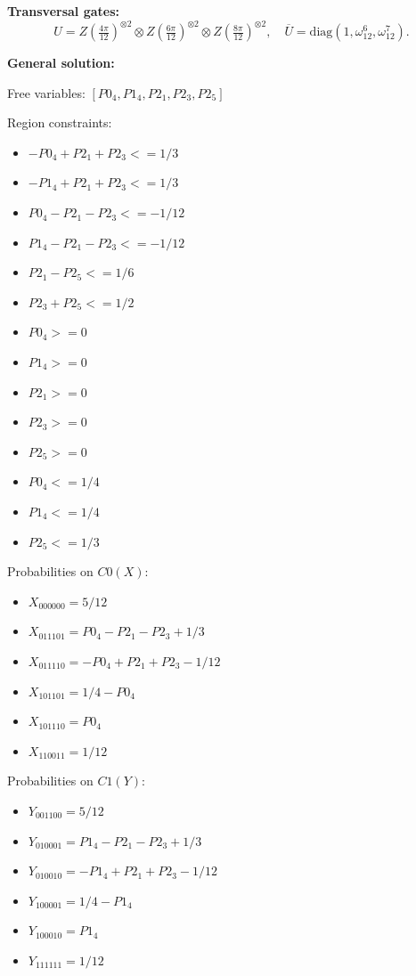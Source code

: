 \documentclass[11pt]{article}
\begin{document}
\noindent\textbf{Transversal gates:}
\[
    U=Z \left(\tfrac{4\pi}{12}\right)^{\otimes2} \otimes Z \left(\tfrac{6\pi}{12}\right)^{\otimes2} \otimes Z \left(\tfrac{8\pi}{12}\right)^{\otimes2},\quad
    \overline U=\mathrm{diag}(1,\omega_{12}^{6},\omega_{12}^{7}).
\]

\noindent\textbf{General solution:}

Free variables: $[P0_4, P1_4, P2_1, P2_3, P2_5]$

Region constraints:
\begin{itemize}
    \item $-P0_4 + P2_1 + P2_3 <= 1/3$
    \item $-P1_4 + P2_1 + P2_3 <= 1/3$
    \item $P0_4 - P2_1 - P2_3 <= -1/12$
    \item $P1_4 - P2_1 - P2_3 <= -1/12$
    \item $P2_1 - P2_5 <= 1/6$
    \item $P2_3 + P2_5 <= 1/2$
    \item $P0_4 >= 0$
    \item $P1_4 >= 0$
    \item $P2_1 >= 0$
    \item $P2_3 >= 0$
    \item $P2_5 >= 0$
    \item $P0_4 <= 1/4$
    \item $P1_4 <= 1/4$
    \item $P2_5 <= 1/3$
\end{itemize}

Probabilities on $C0 (X)$:
\begin{itemize}
    \item $X_{000000} = 5/12$
    \item $X_{011101} = P0_4 - P2_1 - P2_3 + 1/3$
    \item $X_{011110} = -P0_4 + P2_1 + P2_3 - 1/12$
    \item $X_{101101} = 1/4 - P0_4$
    \item $X_{101110} = P0_4$
    \item $X_{110011} = 1/12$
\end{itemize}

Probabilities on $C1 (Y)$:
\begin{itemize}
    \item $Y_{001100} = 5/12$
    \item $Y_{010001} = P1_4 - P2_1 - P2_3 + 1/3$
    \item $Y_{010010} = -P1_4 + P2_1 + P2_3 - 1/12$
    \item $Y_{100001} = 1/4 - P1_4$
    \item $Y_{100010} = P1_4$
    \item $Y_{111111} = 1/12$
\end{itemize}
\end{document}
